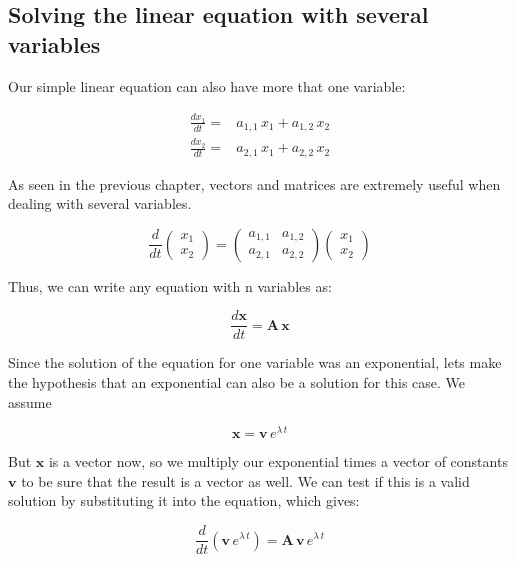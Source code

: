 \documentclass{tufte-book} %
\begin{document}
\subsection{Solving the linear equation with several variables}


Our simple linear equation can also have more that one variable:

\begin{align}
	\label{odenvar}
	\frac{dx_1}{dt} =& a_{1,1} \, x_1 + a_{1,2} \, x_2 \nonumber\\
	\frac{dx_2}{dt} =& a_{2,1} \, x_1 + a_{2,2} \, x_2
\end{align}

As seen in the previous chapter, vectors and matrices are extremely useful when dealing with several variables.

\begin{equation}
	\frac{d}{dt} \begin{pmatrix} x_1\\ x_2 \end{pmatrix} = \begin{pmatrix} a_{1,1} & a_{1,2}\\ a_{2,1} & a_{2,2} \end{pmatrix} \begin{pmatrix} x_1\\ x_2 \end{pmatrix} \nonumber
\end{equation}

Thus, we can write any equation with n variables as:

\begin{equation}
	\label{odenvar_mat}
	\frac{d\mathbf{x}}{dt}  = \mathbf{A} \, \mathbf{x}
\end{equation}

Since the solution of the equation for one variable was an exponential, lets make the hypothesis that an exponential can also be a solution for this case. We assume

\begin{equation}
	\mathbf{x}= \mathbf{v} \, e^{\lambda \, t} \nonumber
\end{equation}

But $\mathbf{x}$ is a vector now, so we multiply our exponential times a  vector of constants $\mathbf{v}$ to be sure that the result is a vector as well. We can test if this is a valid solution by substituting it into the equation, which gives:

\begin{equation}
	\frac{d}{dt} \left( \mathbf{v} \, e^{\lambda \, t} \right)  = \mathbf{A} \, \mathbf{v} \, e^{\lambda \, t}  \nonumber
\end{equation}
\end{document}
